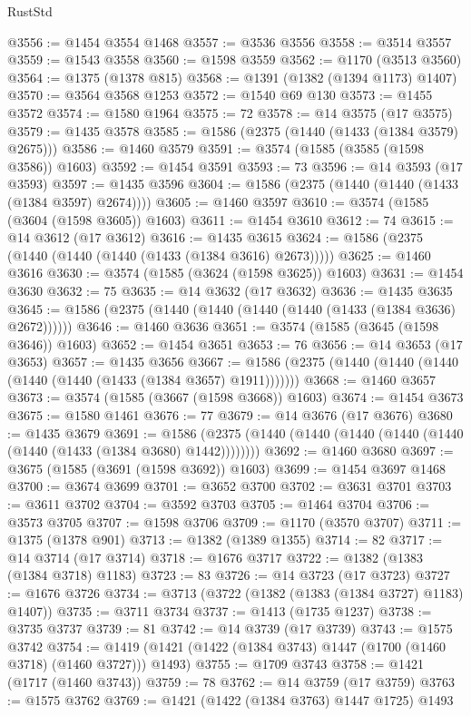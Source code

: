 \begin{lexlean}{RustStd}
\begin{coremodule}
@3556 := @1454 @3554 @1468
@3557 := @3536 @3556
@3558 := @3514 @3557
@3559 := @1543 @3558
@3560 := @1598 @3559
@3562 := @1170 (@3513 @3560)
@3564 := @1375 (@1378 @815)
@3568 := @1391 (@1382 (@1394 @1173) @1407)
@3570 := @3564 @3568 @1253
@3572 := @1540 @69 @130
@3573 := @1455 @3572
@3574 := @1580 @1964
@3575 := 72
@3578 := @14 @3575 (@17 @3575)
@3579 := @1435 @3578
@3585 := @1586 (@2375 (@1440 (@1433 (@1384 @3579) @2675)))
@3586 := @1460 @3579
@3591 := @3574 (@1585 (@3585 (@1598 @3586)) @1603)
@3592 := @1454 @3591
@3593 := 73
@3596 := @14 @3593 (@17 @3593)
@3597 := @1435 @3596
@3604 := @1586 (@2375 (@1440 (@1440 (@1433 (@1384 @3597) @2674))))
@3605 := @1460 @3597
@3610 := @3574 (@1585 (@3604 (@1598 @3605)) @1603)
@3611 := @1454 @3610
@3612 := 74
@3615 := @14 @3612 (@17 @3612)
@3616 := @1435 @3615
@3624 := @1586 (@2375 (@1440 (@1440 (@1440 (@1433 (@1384 @3616) @2673)))))
@3625 := @1460 @3616
@3630 := @3574 (@1585 (@3624 (@1598 @3625)) @1603)
@3631 := @1454 @3630
@3632 := 75
@3635 := @14 @3632 (@17 @3632)
@3636 := @1435 @3635
@3645 := @1586 (@2375 (@1440 (@1440 (@1440 (@1440 (@1433 (@1384 @3636) @2672))))))
@3646 := @1460 @3636
@3651 := @3574 (@1585 (@3645 (@1598 @3646)) @1603)
@3652 := @1454 @3651
@3653 := 76
@3656 := @14 @3653 (@17 @3653)
@3657 := @1435 @3656
@3667 := @1586 (@2375 (@1440 (@1440 (@1440 (@1440 (@1440 (@1433 (@1384 @3657) @1911)))))))
@3668 := @1460 @3657
@3673 := @3574 (@1585 (@3667 (@1598 @3668)) @1603)
@3674 := @1454 @3673
@3675 := @1580 @1461
@3676 := 77
@3679 := @14 @3676 (@17 @3676)
@3680 := @1435 @3679
@3691 := @1586 (@2375 (@1440 (@1440 (@1440 (@1440 (@1440 (@1440 (@1433 (@1384 @3680) @1442))))))))
@3692 := @1460 @3680
@3697 := @3675 (@1585 (@3691 (@1598 @3692)) @1603)
@3699 := @1454 @3697 @1468
@3700 := @3674 @3699
@3701 := @3652 @3700
@3702 := @3631 @3701
@3703 := @3611 @3702
@3704 := @3592 @3703
@3705 := @1464 @3704
@3706 := @3573 @3705
@3707 := @1598 @3706
@3709 := @1170 (@3570 @3707)
@3711 := @1375 (@1378 @901)
@3713 := @1382 (@1389 @1355)
@3714 := 82
@3717 := @14 @3714 (@17 @3714)
@3718 := @1676 @3717
@3722 := @1382 (@1383 (@1384 @3718) @1183)
@3723 := 83
@3726 := @14 @3723 (@17 @3723)
@3727 := @1676 @3726
@3734 := @3713 (@3722 (@1382 (@1383 (@1384 @3727) @1183) @1407))
@3735 := @3711 @3734
@3737 := @1413 (@1735 @1237)
@3738 := @3735 @3737
@3739 := 81
@3742 := @14 @3739 (@17 @3739)
@3743 := @1575 @3742
@3754 := @1419 (@1421 (@1422 (@1384 @3743) @1447 (@1700 (@1460 @3718) (@1460 @3727))) @1493)
@3755 := @1709 @3743
@3758 := @1421 (@1717 (@1460 @3743))
@3759 := 78
@3762 := @14 @3759 (@17 @3759)
@3763 := @1575 @3762
@3769 := @1421 (@1422 (@1384 @3763) @1447 @1725) @1493

\end{coremodule}
\end{lexlean}
